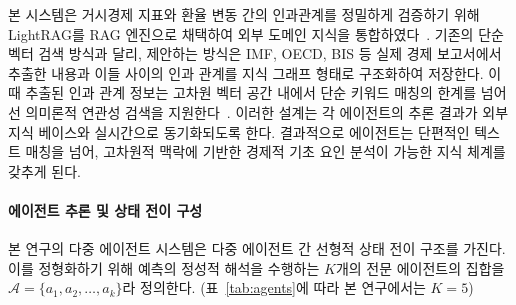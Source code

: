 본 시스템은 거시경제 지표와 환율 변동 간의 인과관계를 정밀하게 검증하기 위해 LightRAG를 RAG 엔진으로 채택하여 외부 도메인 지식을 통합하였다~\cite{Guo2024LightRAG}. 기존의 단순 벡터 검색 방식과 달리, 제안하는 방식은 IMF, OECD, BIS 등 실제 경제 보고서에서 추출한 내용과 이들 사이의 인과 관계를 지식 그래프 형태로 구조화하여 저장한다. 이때 추출된 인과 관계 정보는 고차원 벡터 공간 내에서 단순 키워드 매칭의 한계를 넘어선 의미론적 연관성 검색을 지원한다~\cite{Edge2024GraphRAG}. 이러한 설계는 각 에이전트의 추론 결과가 외부 지식 베이스와 실시간으로 동기화되도록 한다. 결과적으로 에이전트는 단편적인 텍스트 매칭을 넘어, 고차원적 맥락에 기반한 경제적 기초 요인 분석이 가능한 지식 체계를 갖추게 된다.

\paragraph{에이전트 추론 및 상태 전이 구성}
본 연구의 다중 에이전트 시스템은 다중 에이전트 간 선형적 상태 전이 구조를 가진다. 이를 정형화하기 위해 예측의 정성적 해석을 수행하는 $K$개의 전문 에이전트의 집합을 $\mathcal{A} = \{a_1, a_2, \dots, a_k\}$라 정의한다. (표~\ref{tab:agents}에 따라 본 연구에서는 $K=5$)

